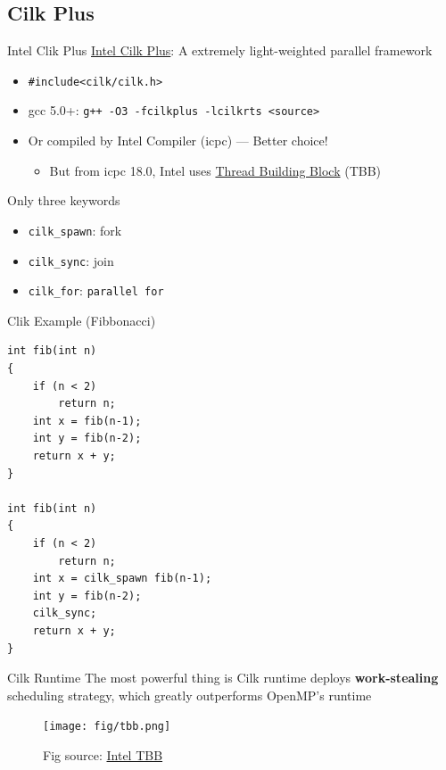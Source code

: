 \documentclass{../TexTemplate/myslide}
\begin{document}
\subsection{Cilk Plus}
\begin{frame}
\subsectionpage
\end{frame}

\begin{frame}[fragile]{Intel Clik Plus}
\href{https://www.cilkplus.org/}{Intel Cilk Plus}: A extremely light-weighted parallel framework
\begin{itemize}
	\item \verb'#include<cilk/cilk.h>'
	\item gcc 5.0+: \verb'g++ -O3 -fcilkplus -lcilkrts <source>'
	\item Or compiled by Intel Compiler (icpc) --- Better choice!
	\begin{itemize}
		\item But from icpc 18.0, Intel uses \href{https://software.intel.com/en-us/articles/migrate-your-application-to-use-openmp-or-intelr-tbb-instead-of-intelr-cilktm-plus?_ga=2.174275746.1279103381.1550824040-508775473.1544510410}{Thread Building Block} (TBB)
	\end{itemize}
\end{itemize}
Only three keywords
\begin{itemize}
	\item \verb'cilk_spawn': fork
	\item \verb'cilk_sync': join
	\item \verb'cilk_for': \verb'parallel for'
\end{itemize}
\end{frame}

\begin{frame}[fragile]{Clik Example (Fibbonacci)}
\begin{lstlisting}
int fib(int n)
{
    if (n < 2)
        return n;
    int x = fib(n-1);
    int y = fib(n-2);
    return x + y;
}

int fib(int n)
{
    if (n < 2)
        return n;
    int x = cilk_spawn fib(n-1);
    int y = fib(n-2);
    cilk_sync;
    return x + y;
}
\end{lstlisting}
\end{frame}

\begin{frame}{Cilk Runtime}
The most powerful thing is Cilk runtime deploys \textbf{work-stealing} scheduling strategy, which greatly outperforms OpenMP's runtime
\begin{figure}[H]
\centering
\texttt{[image: fig/tbb.png]}
\caption*{\small Fig source: \href{https://csdl-images.computer.org/mags/so/2011/01/figures/mso20110100232.gif}{Intel TBB}}
\end{figure}
\end{frame}
\end{document}
